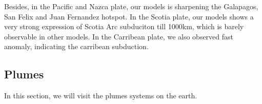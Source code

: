\documentclass[extra,mreferee]{gji}
\begin{document}
Besides, in the Pacific and Nazca plate, our models is sharpening the Galapagos,
San Felix and Juan Fernandez hotspot. In the Scotia plate, our models shows a very
strong expression of Scotia Arc subduciton till 1000km, which is barely observable
in other models. In the Carribean plate, we also observed fast anomaly, indicating
the carribean subduction.

\subsection{Plumes}
\label{section:plumes}

In this section, we will visit the plumes systems on the earth.



\end{document}
